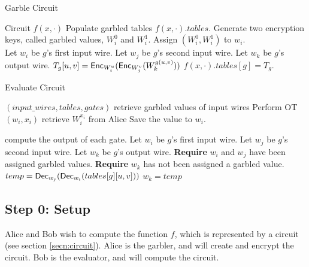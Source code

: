 \begin{algorithm}
\caption{Garble Circuit}
\label{alg:garble}
\begin{algorithmic}
    \Require Circuit $f(x,\cdot)$ 
    \Ensure Populate garbled tables $f(x,\cdot).tables$.
    \State Generate two encryption keys, called garbled values, $W_i^0$ and $W_i^1$.
    \State Assign $(W_i^0, W_i^1)$ to $w_i$.
\EndFor \\

    \State Let $w_i$ be $g$'s first input wire.
    \State Let $w_j$ be $g$'s second input wire.
    \State Let $w_k$ be $g$'s output wire.
    \State $T_g[u,v] = \textsf{Enc}_{W_i^u}( \textsf{Enc}_{W_j^v} ( W_k^{g(u,v)}))$
    \EndFor
    \State $f(x,\cdot).tables[g] = T_g$.
\EndFor
\end{algorithmic}
\end{algorithm}

\begin{algorithm}
\caption{Evaluate Circuit}
\label{alg:evaluate}
\begin{algorithmic}

\Require $(input\_wires, tables, gates)$
	\Comment retrieve garbled values of input wires
	\State Perform OT$(w_i, x_i)$ 
	\Comment retrieve $W^{x_i}_i$ from Alice
	\State Save the value to $w_i$.
\EndFor

	\Comment compute the output of each gate.
	\State Let $w_i$ be $g$'s first input wire.
	\State Let $w_j$ be $g$'s second input wire.
	\State Let $w_k$ be $g$'s output wire.
	\State \textbf{Require} $w_i$ and $w_j$ have been assigned garbled values.
	\State \textbf{Require} $w_k$ has not been assigned a garbled value.
		\State $temp = \textsf{Dec}_{w_j}(\textsf{Dec}_{w_i}(tables[g][u,v]))$
			\State $w_k = temp$
		\EndIf
	\EndFor
\EndFor
\end{algorithmic}
\end{algorithm}

\subsection{Step 0: Setup}
Alice and Bob wish to compute the function $f$, which is represented by a circuit (see section \ref{secn:circuit}).
Alice is the garbler, and will create and encrypt the circuit.
Bob is the evaluator, and will compute the circuit.

